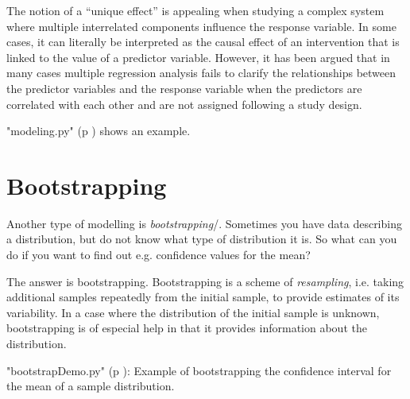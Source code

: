 The notion of a “unique effect” is appealing when studying a complex system where multiple interrelated components influence the response variable. In some cases, it can literally be interpreted as the causal effect of an intervention that is linked to the value of a predictor variable. However, it has been argued that in many cases multiple regression analysis fails to clarify the relationships between the predictor variables and the response variable when the predictors are correlated with each other and are not assigned following a study design.

\PyImg "modeling.py" (p \pageref{py:modeling}) shows an example.

\section{Bootstrapping} 

Another type of modelling is \emph{bootstrapping}/. Sometimes you have data describing a distribution, but do not know what type of distribution it is. So what can you do if you want to find out e.g. confidence values for the mean?

The answer is bootstrapping. Bootstrapping is a scheme of \emph{resampling}, i.e. taking additional samples repeatedly from the initial sample, to provide estimates of its variability. In a case where the distribution of the initial sample is unknown, bootstrapping is of especial help in that it provides information about the distribution.

\PyImg "bootstrapDemo.py" (p \pageref{py:bootstrapDemo}): Example of bootstrapping the confidence interval for the mean of a sample distribution.
